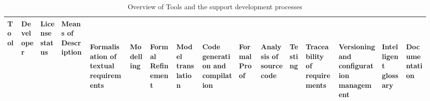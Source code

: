 \documentclass{./template/openetcs2}
\begin{document}
 \begin{landscape}
 \begin{center}

\begin{longtable}{|m{2.5cm}|p{3cm}|m{1.8cm}|p{3.5cm}||m{1.2cm}|m{0.2cm}|m{0.2cm}|m{0.2cm}|m{0.7cm}|m{0.2cm}|m{0.7cm}|m{0.2cm}|m{0.6cm}|m{1.2cm}|m{0.2cm}|m{0.2cm}|}

\caption{Overview of Tools and the support development processes}
\label{tab: Tools}\\

\hline Tool & Developer & License status & Means of Description & \begin{sideways} {~\parbox{3cm}{Formalisation of textual requirements}}\end{sideways} & \begin{sideways} {~\parbox{3cm}{Modelling}} \end{sideways}& \begin{sideways} {~\parbox{3cm}{Formal Refinement}} \end{sideways} & \begin{sideways} {~\parbox{3cm}{Model translation}} \end{sideways} & \begin{sideways} {~\parbox{3cm}{Code generation and compilation}} \end{sideways} & \begin{sideways} {~\parbox{3cm}{Formal Proof}} \end{sideways} & \begin{sideways} {~\parbox{3cm}{Analysis of source code}} \end{sideways} & \begin{sideways} {~\parbox{3cm}{Testing}} \end{sideways}  & \begin{sideways} {~\parbox{3cm}{Traceability of requirements}} \end{sideways} & \begin{sideways} {~\parbox{3cm}{Versioning and configuration management}} \end{sideways} & \begin{sideways} {~\parbox{3cm}{Intelligent glossary}} \end{sideways} & \begin{sideways} {~\parbox{3cm}{Documentation}} \end{sideways} \\ \hline
\endfirsthead


\end{longtable}
\end{center}
\end{landscape}
\end{document}
